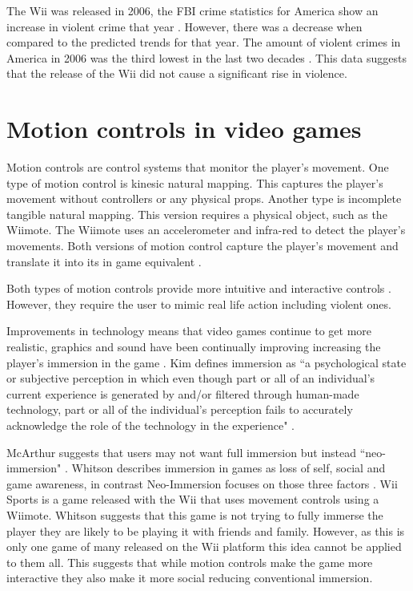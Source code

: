 \documentclass{scrartcl}
\begin{document}
The Wii was released in 2006, the FBI crime statistics for America show an increase in violent crime that year \cite{FBI}.  However, there was a decrease when compared to the predicted trends for that year. The amount of violent crimes in America in 2006 was the third lowest in the last two decades \cite{FBIArchives}. This data suggests that the release of the Wii did not cause a significant rise in violence.


\section{Motion controls in video games}
Motion controls are control systems that monitor the player's movement. One type of motion control is kinesic natural mapping. This captures the player's movement without controllers or any physical props. Another type is incomplete tangible natural mapping. This version requires a physical object, such as the Wiimote. The Wiimote uses an accelerometer and infra-red to detect the player's movements. Both versions of motion control capture the player's movement and translate it into its in game equivalent \cite{McEwan2012}.

Both types of motion controls provide more intuitive and interactive controls \cite{Kim}.  However, they require the user to mimic real life action including violent ones. 

\bigskip
Improvements in technology means that video games continue to get more realistic, graphics and sound have been continually improving increasing the player's immersion in the game \cite{Kim}. Kim defines immersion as ``a psychological state or subjective perception in which even though part or all of an   individual’s   current   experience is generated by and/or filtered through human-made technology, part or all of the individual’s perception fails to accurately acknowledge the role of the technology in the experience" \cite{Kim}.

\bigskip
McArthur suggests that users may not want full immersion but instead ``neo-immersion" \cite{McArthur}. Whitson describes immersion in games as loss of  self, social and game awareness, in contrast Neo-Immersion focuses on those three factors \cite{Whitson}. Wii Sports is a game released with the Wii that uses movement controls using a Wiimote. Whitson suggests that this game is not trying to fully immerse the player they are likely to be playing it with friends and family. However, as this is only one game of many released on the Wii platform this idea cannot be applied to them all. This suggests that while motion controls make the game more interactive they also make it more social reducing conventional immersion.
\end{document}
